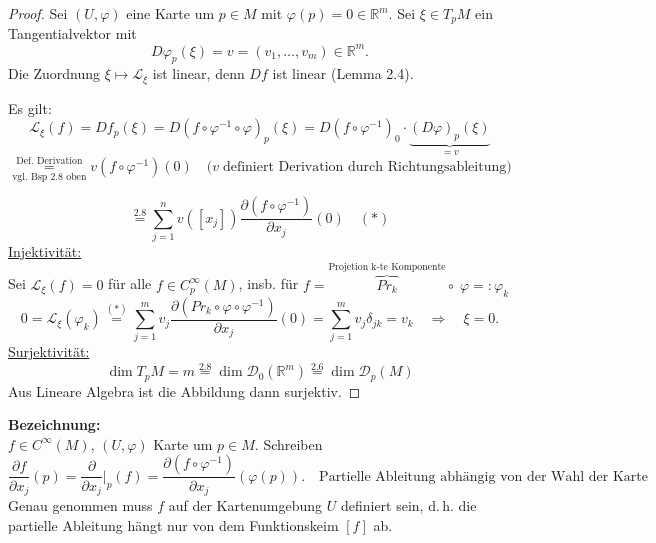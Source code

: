\documentclass[fleqn, 12pt, letterpaper]{article}
\newcommand{\deldel}[2]{\frac{\partial #1}{\partial #2}}
\newcommand{\txt}[1]{\text{#1}}
\begin{document}
\begin{proof}
    Sei \((U, \varphi)\) eine Karte um \(p \in M\) mit \(\varphi(p) = 0 \in \mathbb{R}^m\).  
Sei \(\xi \in T_p M\) ein Tangentialvektor mit
\[
D\varphi_p(\xi) = v=(v_1,\dots,v_m) \in \mathbb{R}^m.
\]
Die Zuordnung \(\xi \mapsto \mathcal{L}_\xi\) ist linear, denn \(Df\) ist linear (Lemma 2.4).

Es gilt:
\[
\mathcal{L}_{\xi}(f) = Df_{p}(\xi) = D(f \circ \varphi^{-1} \circ \varphi)_{p}(\xi) =  D(f \circ \varphi^{-1})_{0} \cdot \underbrace{(D\varphi)_{p}(\xi)}_{=v}   
\]
\[
\underset{\txt{vgl. Bsp 2.8 oben}}{\overset{\txt{Def. Derivation}}{=}} v(f \circ \varphi^{-1})(0) \quad (v \;\txt{definiert Derivation durch Richtungsableitung)}
\]

\[
\overset{2.8}{=}  \sum_{j=1}^{n}v([x_j])\deldel{(f \circ \varphi^{-1})}{x_j}(0)   \quad (*)
\]
\underline{Injektivität:} \\
Sei \(\mathcal{L}_\xi(f) = 0\) für alle \(f \in C_p^\infty(M)\), insb. für \(f = \overbrace{Pr_k}^{\txt{Projetion k-te Komponente}} \circ \;\varphi=:\varphi_k\)
\[
0 = \mathcal{L}_{\xi}(\varphi_k) \overset{(*)}{=} \sum_{j=1}^m v_j\deldel{(Pr_k \circ \varphi \circ \varphi^{-1})}{x_j}(0) = \sum_{j=1}^m v_j\delta_{jk} =v_k \quad \Rightarrow \quad \xi = 0.
\]
\underline{Surjektivität:} \\
\[
\dim T_p M = m \overset{2.8}{=} \dim \mathcal{D}_0(\mathbb{R}^m) \overset{2.6}{=} \dim \mathcal{D}_p(M)
\]
Aus Lineare Algebra ist die Abbildung dann surjektiv.
\end{proof}

\textbf{Bezeichnung:} \\
\(f \in C^\infty(M)\), \((U, \varphi)\) Karte um \(p \in M\). Schreiben
\[
\frac{\partial f}{\partial x_j}(p) = \deldel{}{x_j}|_p(f) = \deldel{(f \circ \varphi^{-1})}{x_j}(\varphi(p)). \quad \txt{Partielle Ableitung abhängig von der Wahl der Karte}
\]
Genau genommen muss \(f\) auf der Kartenumgebung \(U\) definiert sein, d.\,h. die partielle Ableitung hängt nur von dem Funktionskeim \([f]\) ab.

\vspace{1em}
\end{document}
